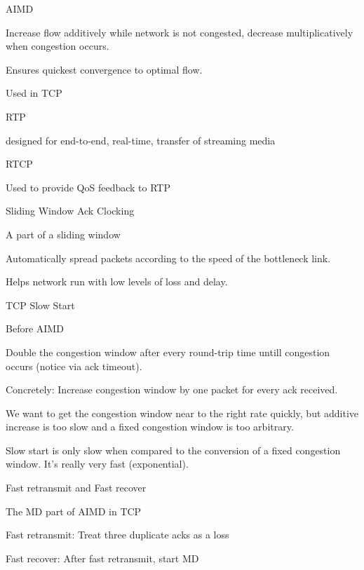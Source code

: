 \documentclass[main.tex]{subfiles}
\begin{document}
\begin{card}{AIMD}
\item Increase flow additively while network is not congested, decrease multiplicatively when congestion occurs.
\item Ensures quickest convergence to optimal flow.
\item Used in TCP
\end{card}

\begin{card}{RTP}
\item designed for end-to-end, real-time, transfer of streaming media
\end{card}

\begin{card}{RTCP}
\item Used to provide QoS feedback to RTP
\end{card}

\begin{card}{Sliding Window Ack Clocking}
\item A part of a sliding window
\item Automatically spread packets according to the speed of the bottleneck link.
\item Helps network run with low levels of loss and delay.
\end{card}

\begin{card}{TCP Slow Start}
\item Before AIMD
\item Double the congestion window after every round-trip time untill congestion occurs (notice via ack timeout).
\item Concretely: Increase congestion window by one packet for every ack received.
\item We want to get the congestion window near to the right rate quickly, but additive increase is too slow and a fixed congestion window is too arbitrary.
\item Slow start is only slow when compared to the conversion of a fixed congestion window. It's really very fast (exponential).
\end{card}

\begin{card}{Fast retransmit and Fast recover}
\item The MD part of AIMD in TCP
\item Fast retransmit: Treat three duplicate acks as a loss
\item Fast recover: After fast retransmit, start MD
\end{card}
\end{document}
